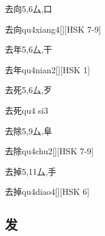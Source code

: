 \begin{Entry}{去向}{5,6}{⼛,⼝}
  \begin{Phonetics}{去向}{qu4xiang4}[][HSK 7-9]
  \end{Phonetics}
\end{Entry}

\begin{Entry}{去年}{5,6}{⼛,⼲}
  \begin{Phonetics}{去年}{qu4nian2}[][HSK 1]
  \end{Phonetics}
\end{Entry}

\begin{Entry}{去死}{5,6}{⼛,⽍}
  \begin{Phonetics}{去死}{qu4 si3}
  \end{Phonetics}
\end{Entry}

\begin{Entry}{去除}{5,9}{⼛,⾩}
  \begin{Phonetics}{去除}{qu4chu2}[][HSK 7-9]
  \end{Phonetics}
\end{Entry}

\begin{Entry}{去掉}{5,11}{⼛,⼿}
  \begin{Phonetics}{去掉}{qu4diao4}[][HSK 6]
  \end{Phonetics}
\end{Entry}

\subsection*{发}

